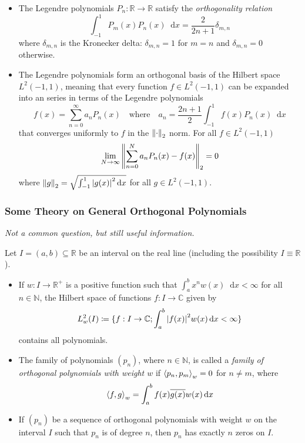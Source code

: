 \documentclass[11pt, a4paper]{article}
\newcommand{\question}[1]{\textit{#1}\vspace{2mm}}
\newcommand{\R}{\mathbb{R}} %
\newcommand{\C}{\mathbb{C}} %
\newcommand{\diff}{\mathop{}\!\mathrm{d}} %
\begin{document}
\begin{itemize}
	\item The Legendre polynomials $ P_{n} : \R \to \R $ satisfy the \textit{orthogonality relation} 
	\begin{equation*}
		\int_{-1}^{1}P_m(x)P_n(x) \diff x = \frac{2}{2n+1}\delta_{m, n}
	\end{equation*}
	where $ \delta_{m, n} $ is the Kronecker delta: $ \delta_{m, n} = 1 $ for $ m = n $ and $ \delta_{m, n} = 0 $ otherwise.
	
	\item The Legendre polynomials form an orthogonal basis of the Hilbert space $ L^{2}(-1, 1) $, meaning that every function $ f \in L^2(-1, 1) $ can be expanded into an series in terms of the Legendre polynomials
	\begin{equation*}
		f(x) = \sum_{n=0}^{\infty}a_nP_n(x) \quad \text{where} \quad  a_n = \frac{2n+1}{2}\int_{-1}^{1}f(x)P_n(x) \diff x
	\end{equation*}
	that converges uniformly to $ f $ in the $ \norm{\cdot}_{2} $ norm. For all $ f \in L^2(-1, 1) $
	\begin{equation*}
		\lim_{N\to \infty}\norm{\sum_{n=0}^{N}a_n P_n(x) - f(x)}_{2} = 0
	\end{equation*}
	where $ \norm{g}_{2} = \sqrt{\int_{-1}^{1} \abs{g(x)}^2\diff x}  $ for all $ g \in L^2(-1, 1) $.
\end{itemize}


\subsubsection{Some Theory on General Orthogonal Polynomials}
\question{Not a common question, but still useful information.}

Let $ I = (a, b) \subseteq \R $ be an interval on the real line (including the possibility $ I \equiv \R $).
	
\begin{itemize}
	\item If $ w : I \to \R^+ $ is a positive function such that $ \int_{a}^{b} x^n w(x) \diff x < \infty $ for all $ n \in \mathbb{N} $, the Hilbert space of functions $ f : I \to \C $ given by
	\begin{equation*}
		L_{w}^2(I) \coloneqq \{f : I \to \C; \int_{a}^{b}\abs{f(x)}^2 w(x)\diff x < \infty \}
	\end{equation*}
	contains all polynomials. 
	
	\item The family of polynomials $ (p_n) $, where $ n \in \mathbb{N} $, is called a \textit{family of orthogonal polynomials with weight $ w $} if $ \expval{p_n, p_m}_{w} = 0 $ for $ n \neq m $, where
	\begin{equation*}
		\expval{f, g}_{w} = \int_{a}^{b} f(x) \overline{g(x)}w(x) \diff x
	\end{equation*}
	
	\item If $ (p_n) $ be a sequence of orthogonal polynomials with weight $ w $ on the interval $ I $ such that $ p_n $ is of degree $ n $, then $ p_n $ has exactly $ n $ zeros on $ I $.
\end{itemize}
\end{document}
